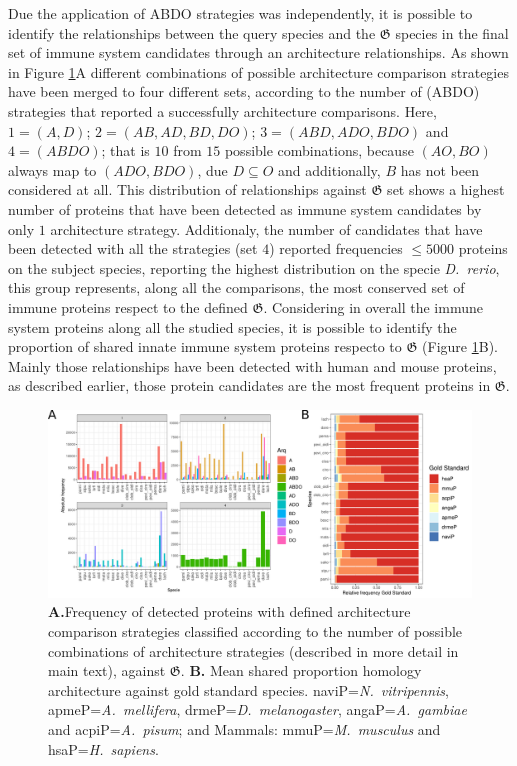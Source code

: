 \documentclass[11pt]{article}
\begin{document}
Due the application of ABDO strategies was independently, it is possible to 
identify the relationships between the query species and the 
$\boldsymbol{\mathfrak{G}}$ species in the final set of immune system 
candidates through an architecture relationships. As shown in Figure 
\ref{fig:FrecEstrat}A different combinations of possible architecture 
comparison strategies have been merged to four different sets, according to the 
number of (ABDO) strategies that reported a successfully architecture 
comparisons. Here, $1 = (A, D)$; $2 = (AB, AD, BD, DO)$; $3 = (ABD, ADO, BDO)$ 
and $4 = (ABDO)$; that is $10$ from $15$ possible combinations, because $(AO, 
BO)$ always map to $(ADO, BDO)$, due $D \subseteq O$ and additionally, $B$ has 
not been considered at all. This distribution of relationships against 
$\boldsymbol{\mathfrak{G}}$ set shows a highest number of proteins that have 
been detected as immune system candidates by only $1$ architecture strategy. 
Additionaly, the number of candidates that have been detected with all the 
strategies (set $4$) reported frequencies $\leq 5000$ proteins on the subject 
species, reporting the highest distribution on the specie \textit{D.\ rerio}, 
this group represents, along all the comparisons, the most conserved set of 
immune proteins respect to the defined $\boldsymbol{\mathfrak{G}}$. Considering 
in overall the immune system proteins along all the studied species, it is 
possible to identify the proportion of shared innate immune system proteins 
respecto to $\boldsymbol{\mathfrak{G}}$ (Figure \ref{fig:FrecEstrat}B). Mainly 
those relationships have been detected with human and mouse proteins, as 
described earlier, those protein candidates are the most frequent proteins in 
$\boldsymbol{\mathfrak{G}}$.

\begin{figure}[ht!]
\centering
\includegraphics[scale=0.43]{figures/unitedComparedGOLD}%
\caption{\textbf{A.}Frequency of detected proteins with defined architecture
comparison strategies classified according to the number of possible combinations of 
architecture strategies (described in more detail in main text), 
against $\boldsymbol{\mathfrak{G}}$. \textbf{B.} Mean shared proportion homology 
architecture against gold standard species. \textsf{naviP=}\textit{N.\ 
vitripennis}, \textsf{apmeP=}\textit{A.\ mellifera}, \textsf{drmeP=}\textit{D.\ 
melanogaster}, \textsf{angaP=}\textit{A.\ gambiae} and 
\textsf{acpiP=}\textit{A.\ pisum}; and Mammals: \textsf{mmuP=}\textit{M.\ 
musculus} and \textsf{hsaP=}\textit{H.\ sapiens}.}
\label{fig:FrecEstrat}
\end{figure}
\end{document}
